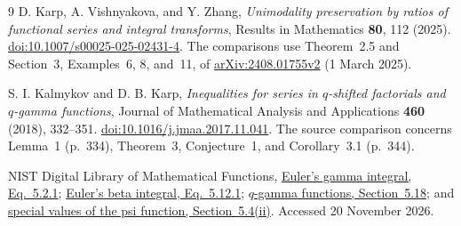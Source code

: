 \documentclass[11pt,a4paper]{article}
\theoremstyle{definition}
\theoremstyle{remark}
\begin{document}
\begin{thebibliography}{9}
D. Karp, A. Vishnyakova, and Y. Zhang,
\emph{Unimodality preservation by ratios of functional series and
integral transforms}, Results in Mathematics \textbf{80}, 112 (2025).
\href{https://doi.org/10.1007/s00025-025-02431-4}{doi:10.1007/s00025-025-02431-4}.
The comparisons use Theorem~2.5 and Section~3, Examples~6, 8, and~11,
of \href{https://arxiv.org/abs/2408.01755v2}{arXiv:2408.01755v2}
(1 March 2025).

S. I. Kalmykov and D. B. Karp,
\emph{Inequalities for series in \(q\)-shifted factorials and
\(q\)-gamma functions}, Journal of Mathematical Analysis and
Applications \textbf{460} (2018), 332--351.
\href{https://doi.org/10.1016/j.jmaa.2017.11.041}{doi:10.1016/j.jmaa.2017.11.041}.
The source comparison concerns Lemma~1 (p.~334), Theorem~3,
Conjecture~1, and Corollary~3.1 (p.~344).

NIST Digital Library of Mathematical Functions,
\href{https://dlmf.nist.gov/5.2.E1}{Euler's gamma integral, Eq.~5.2.1};
\href{https://dlmf.nist.gov/5.12.E1}{Euler's beta integral, Eq.~5.12.1};
\href{https://dlmf.nist.gov/5.18}{\(q\)-gamma functions, Section~5.18};
and \href{https://dlmf.nist.gov/5.4.ii}{special values of the
psi function, Section~5.4(ii)}. Accessed 20 November 2026.
\end{thebibliography}
\end{document}
